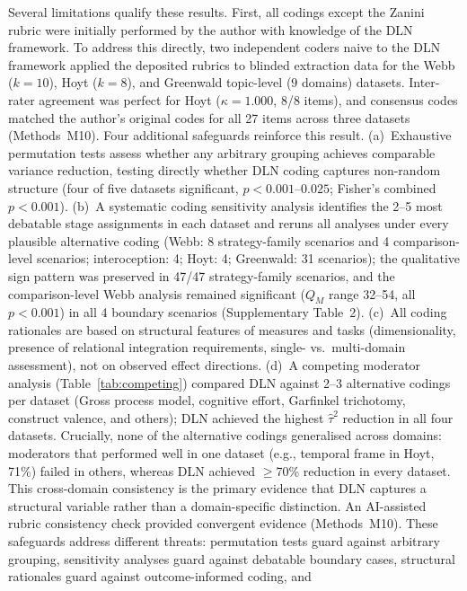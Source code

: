 \documentclass[11pt]{article}
\begin{document}
Several limitations qualify these results. First, all codings except
the Zanini rubric were initially performed by the author with
knowledge of the DLN framework. To address this directly, two
independent coders naive to the DLN framework applied the deposited
rubrics to blinded extraction data for the Webb ($k = 10$), Hoyt
($k = 8$), and Greenwald topic-level ($9$ domains) datasets.
Inter-rater agreement was perfect for Hoyt
($\kappa = 1.000$, 8/8 items), and consensus codes matched the
author's original codes for all 27 items across three datasets
(Methods~M10). Four additional safeguards reinforce this result.
(a)~Exhaustive permutation tests assess
whether any arbitrary grouping achieves comparable variance
reduction, testing directly whether DLN coding captures non-random
structure (four of five datasets significant, $p < 0.001$--$0.025$;
Fisher's combined $p < 0.001$). (b)~A systematic coding sensitivity
analysis identifies the 2--5 most debatable stage assignments in each
dataset and reruns all analyses under every plausible alternative
coding (Webb: 8 strategy-family scenarios and 4 comparison-level
scenarios; interoception: 4; Hoyt: 4; Greenwald: 31 scenarios); the
qualitative sign pattern was preserved in 47/47 strategy-family
scenarios, and the
comparison-level Webb analysis remained significant ($Q_M$ range
32--54, all $p < 0.001$) in all 4 boundary scenarios
(Supplementary Table~2). (c)~All coding rationales are based on structural features
of measures and tasks (dimensionality, presence of relational
integration requirements, single- vs.\ multi-domain assessment), not
on observed effect directions. (d)~A competing moderator analysis
(Table~\ref{tab:competing}) compared DLN against 2--3 alternative
codings per dataset (Gross process model, cognitive effort, Garfinkel
trichotomy, construct valence, and others); DLN achieved the highest
$\hat\tau^2$ reduction in all four datasets. Crucially, none of the
alternative codings generalised across domains: moderators that
performed well in one dataset (e.g., temporal frame in Hoyt, 71\%)
failed in others, whereas DLN achieved $\geq$70\% reduction in every
dataset. This cross-domain consistency is the primary evidence that DLN
captures a structural variable rather than a domain-specific
distinction. An AI-assisted rubric consistency check provided
convergent evidence (Methods~M10). These safeguards address different
threats: permutation tests guard against arbitrary grouping,
sensitivity analyses guard against debatable boundary cases,
structural rationales guard against outcome-informed coding, and
\end{document}
